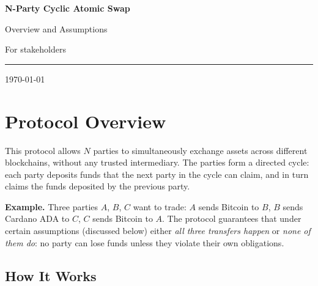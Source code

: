 \documentclass[11pt,a4paper]{article}
\begin{document}
\begin{titlepage}
\centering
\vspace*{2.5cm}
{\huge\bfseries\color{protoblue}
  N-Party Cyclic Atomic Swap\par}
\vspace{0.6cm}
{\Large\color{black}
  Overview and Assumptions\par}
\vspace{0.4cm}
{\large\color{gray}
  For stakeholders\par}
\vspace{1.0cm}
\color{rulecolor}\rule{0.8\textwidth}{1.2pt}
\vfill
{\normalsize\color{gray}\today}
\end{titlepage}

\section{Protocol Overview}

This protocol allows $N$ parties to simultaneously exchange assets across
different blockchains, without any trusted intermediary.
The parties form a directed cycle: each party deposits funds that the next
party in the cycle can claim, and in turn claims the funds deposited by the
previous party.

\medskip\noindent\textbf{Example.}\;
Three parties $A$, $B$, $C$ want to trade:
$A$ sends Bitcoin to $B$, $B$ sends Cardano ADA to $C$, $C$ sends Bitcoin
to $A$.
The protocol guarantees that under certain assumptions (discussed below) 
either \emph{all three transfers happen} or
\emph{none of them do}: no party can lose funds unless they violate their
own obligations.

\subsection*{How It Works}
\end{document}
